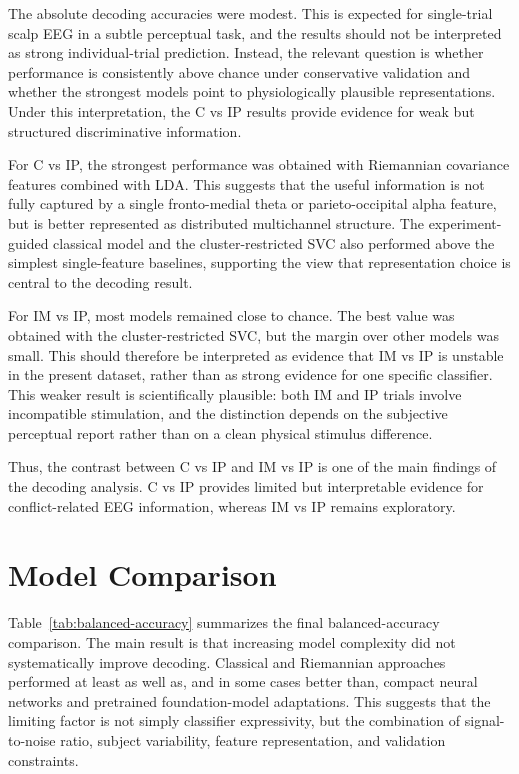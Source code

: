 \documentclass[11pt,a4paper,chapterprefix=false,parskip=false]{scrreprt}
\begin{document}
The absolute decoding accuracies were modest. This is expected for single-trial scalp EEG in a subtle perceptual task, and the results should not be interpreted as strong individual-trial prediction. Instead, the relevant question is whether performance is consistently above chance under conservative validation and whether the strongest models point to physiologically plausible representations. Under this interpretation, the C vs IP results provide evidence for weak but structured discriminative information.

For C vs IP, the strongest performance was obtained with Riemannian covariance features combined with LDA. This suggests that the useful information is not fully captured by a single fronto-medial theta or parieto-occipital alpha feature, but is better represented as distributed multichannel structure. The experiment-guided classical model and the cluster-restricted SVC also performed above the simplest single-feature baselines, supporting the view that representation choice is central to the decoding result.

For IM vs IP, most models remained close to chance. The best value was obtained with the cluster-restricted SVC, but the margin over other models was small. This should therefore be interpreted as evidence that IM vs IP is unstable in the present dataset, rather than as strong evidence for one specific classifier. This weaker result is scientifically plausible: both IM and IP trials involve incompatible stimulation, and the distinction depends on the subjective perceptual report rather than on a clean physical stimulus difference.

Thus, the contrast between C vs IP and IM vs IP is one of the main findings of the decoding analysis. C vs IP provides limited but interpretable evidence for conflict-related EEG information, whereas IM vs IP remains exploratory.

\section{Model Comparison}

Table~\ref{tab:balanced-accuracy} summarizes the final balanced-accuracy comparison. The main result is that increasing model complexity did not systematically improve decoding. Classical and Riemannian approaches performed at least as well as, and in some cases better than, compact neural networks and pretrained foundation-model adaptations. This suggests that the limiting factor is not simply classifier expressivity, but the combination of signal-to-noise ratio, subject variability, feature representation, and validation constraints.
\end{document}
